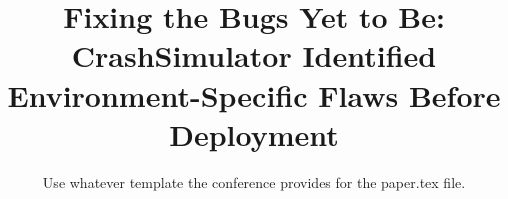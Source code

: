 \documentclass{sig-alternate}
\begin{document}

\title{Fixing the Bugs Yet to Be: CrashSimulator Identified
Environment-Specific Flaws Before Deployment}


\newcommand{\showurlx}{[redacted]}

\author{
Use whatever template the conference provides for the paper.tex file.
}

\maketitle



% 



% 





{\footnotesize 
}
\end{document}
